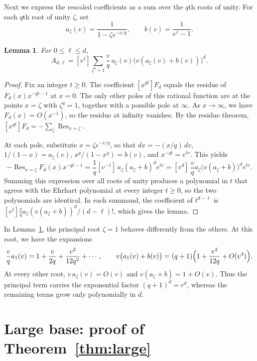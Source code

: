 \documentclass[11pt]{amsart}
\newtheorem{lemma}[theorem]{Lemma}
\theoremstyle{remark}
\newcommand{\Res}{\operatorname{Res}}
\begin{document}
Next we express the rescaled coefficients as a sum over the $q$th roots of
unity. For each $q$th root of unity $\zeta$, set
\[
 a_\zeta(v)=\frac{1}{1-\zeta e^{-v/q}},\qquad b(v)=\frac{1}{e^v-1}.
\]

\begin{lemma}\label{lem:residue}
For $0\le\ell\le d$,
\[
 A_{d,\ell}=[v^\ell]\sum_{\zeta^q=1}\frac vq\,a_\zeta(v)\bigl(v(a_\zeta(v)+b(v))\bigr)^d .
\]
\end{lemma}

\begin{proof}
Fix an integer $t\ge0$. The coefficient $[x^{qt}]F_d$ equals the residue of
$F_d(x)x^{-qt-1}$ at $x=0$. The only other poles of this rational function are
at the points $x=\zeta$ with $\zeta^q=1$, together with a possible pole at
$\infty$. As $x\to\infty$, we have $F_d(x)=O(x^{-1})$, so the residue at
infinity vanishes. By the residue theorem,
$[x^{qt}]F_d=-\sum_\zeta\Res_{x=\zeta}$.

At each pole, substitute $x=\zeta e^{-v/q}$, so that $dx=-(x/q)\,dv$,
$1/(1-x)=a_\zeta(v)$, $x^q/(1-x^q)=b(v)$, and $x^{-qt}=e^{tv}$. This yields
\[
 -\Res_{x=\zeta}F_d(x)x^{-qt-1}
 =\frac1q[v^{-1}]\,a_\zeta(a_\zeta+b)^de^{tv}
 =[v^{d}]\,\frac vq a_\zeta\bigl(v(a_\zeta+b)\bigr)^de^{tv}.
\]
Summing this expression over all roots of unity produces a polynomial in $t$
that agrees with the Ehrhart polynomial at every integer $t\ge0$, so the two
polynomials are identical. In each summand, the coefficient of $t^{d-\ell}$ is
$[v^\ell]\frac vq a_\zeta(v(a_\zeta+b))^d/(d-\ell)!$, which gives the lemma.
\end{proof}

In Lemma~\ref{lem:residue}, the principal root $\zeta=1$ behaves differently
from the others. At this root, we have the expansions
\begin{equation}\label{eq:principal}
 \frac vq a_1(v)=1+\frac{v}{2q}+\frac{v^2}{12q^2}+\cdots,\qquad
 v\bigl(a_1(v)+b(v)\bigr)=(q+1)\Bigl(1+\frac{v^2}{12q}+O(v^4)\Bigr).
\end{equation}
At every other root, $v\,a_\zeta(v)=O(v)$ and $v(a_\zeta+b)=1+O(v)$. Thus the
principal term carries the exponential factor $(q+1)^d=r^d$, whereas the
remaining terms grow only polynomially in $d$.

\section{Large base: proof of Theorem~\ref{thm:large}}\label{sec:large}
\end{document}
